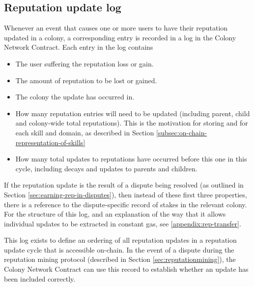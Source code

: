 \subsection{Reputation update log}\label{subsec:reputation-update-log}

Whenever an event that causes one or more users to have their reputation updated in a colony, a corresponding entry is recorded in a log in the Colony Network Contract. Each entry in the log contains

\begin{itemize}
\item The user suffering the reputation loss or gain.
\item The amount of reputation to be lost or gained.
\item The colony the update has occurred in.
\item How many reputation entries will need to be updated (including parent, child and colony-wide total reputations). This is the motivation for storing  and  for each skill and domain, as described in Section \ref{subsec:on-chain-representation-of-skills}
\item How many total updates to reputations have occurred before this one in this cycle, including decays and updates to parents and children.
\end{itemize}

If the reputation update is the result of a dispute being resolved (as outlined in Section \ref{sec:earning-rep-in-disputes}), then instead of these first three properties, there is a reference to the dispute-specific record of stakes in the relevant colony. For the structure of this log, and an explanation of the way that it allows individual updates to be extracted in constant gas, see \ref{appendix:rep-transfer}.

This log exists to define an ordering of all reputation updates in a reputation update cycle that is accessible on-chain. In the event of a dispute during the reputation mining protocol (described in Section \ref{sec:reputationmining}), the Colony Network Contract can use this record to establish whether an update has been included correctly.

